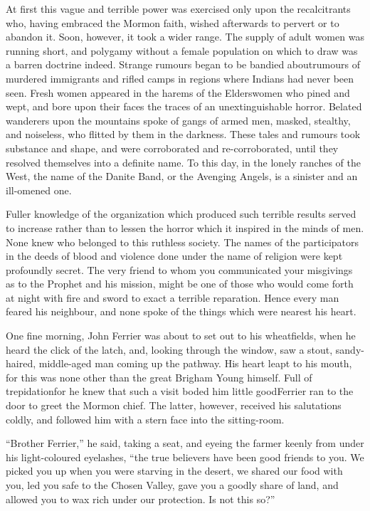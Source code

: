 \documentclass[12pt,english]{book}
\begin{document}
At first this vague and terrible power was exercised only upon the
recalcitrants who, having embraced the Mormon faith, wished afterwards
to pervert or to abandon it. Soon, however, it took a wider range.
The supply of adult women was running short, and polygamy without
a female population on which to draw was a barren doctrine indeed.
Strange rumours began to be bandied about\mdsh{---}rumours of murdered
immigrants and rifled camps in regions where Indians had never been
seen. Fresh women appeared in the harems of the Elders\mdsh{---}women
who pined and wept, and bore upon their faces the traces of an unextinguishable
horror. Belated wanderers upon the mountains spoke of gangs of armed
men, masked, stealthy, and noiseless, who flitted by them in the darkness.
These tales and rumours took substance and shape, and were corroborated
and re-corroborated, until they resolved themselves into a definite
name. To this day, in the lonely ranches of the West, the name of
the Danite Band, or the Avenging Angels, is a sinister and an ill-omened
one.

Fuller knowledge of the organization which produced such terrible
results served to increase rather than to lessen the horror which
it inspired in the minds of men. None knew who belonged to this ruthless
society. The names of the participators in the deeds of blood and
violence done under the name of religion were kept profoundly secret.
The very friend to whom you communicated your misgivings as to the
Prophet and his mission, might be one of those who would come forth
at night with fire and sword to exact a terrible reparation. Hence
every man feared his neighbour, and none spoke of the things which
were nearest his heart.

One fine morning, John Ferrier was about to set out to his wheatfields,
when he heard the click of the latch, and, looking through the window,
saw a stout, sandy-haired, middle-aged man coming up the pathway.
His heart leapt to his mouth, for this was none other than the great
Brigham Young himself. Full of trepidation\mdsh{---}for he knew that
such a visit boded him little good\mdsh{---}Ferrier ran to the door
to greet the Mormon chief. The latter, however, received his salutations
coldly, and followed him with a stern face into the sitting-room.

{}``Brother Ferrier,'' he said, taking a seat, and eyeing the farmer
keenly from under his light-coloured eyelashes, {}``the true believers
have been good friends to you. We picked you up when you were starving
in the desert, we shared our food with you, led you safe to the Chosen
Valley, gave you a goodly share of land, and allowed you to wax rich
under our protection. Is not this so?''
\end{document}

